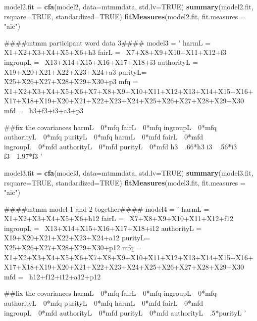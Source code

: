 \documentclass[english,man]{apa6}
\newenvironment{Shaded}{\begin{snugshade}}{\end{snugshade}}
\newcommand{\KeywordTok}[1]{\textcolor[rgb]{0.13,0.29,0.53}{\textbf{#1}}}
\newcommand{\DataTypeTok}[1]{\textcolor[rgb]{0.13,0.29,0.53}{#1}}
\newcommand{\StringTok}[1]{\textcolor[rgb]{0.31,0.60,0.02}{#1}}
\newcommand{\OtherTok}[1]{\textcolor[rgb]{0.56,0.35,0.01}{#1}}
\newcommand{\NormalTok}[1]{#1}
\theoremstyle{definition}
\theoremstyle{definition}
\theoremstyle{definition}
\theoremstyle{remark}
\begin{document}
\begin{Shaded}
\begin{Highlighting}[]
\NormalTok{model2.fit =}\StringTok{ }\KeywordTok{cfa}\NormalTok{(model2, }\DataTypeTok{data=}\NormalTok{mtmmdata, }\DataTypeTok{std.lv=}\OtherTok{TRUE}\NormalTok{)}
\KeywordTok{summary}\NormalTok{(model2.fit, }\DataTypeTok{rsquare=}\OtherTok{TRUE}\NormalTok{, }\DataTypeTok{standardized=}\OtherTok{TRUE}\NormalTok{)}
\KeywordTok{fitMeasures}\NormalTok{(model2.fit, }\DataTypeTok{fit.measures =} \StringTok{"aic"}\NormalTok{)}

\NormalTok{####mtmm participant word data 3####}
\NormalTok{model3 =}\StringTok{ '}
\StringTok{harmL =~ X1+X2+X3+X4+X5+X6+h3}
\StringTok{fairL =~ X7+X8+X9+X10+X11+X12+f3}
\StringTok{ingroupL =~ X13+X14+X15+X16+X17+X18+i3}
\StringTok{authorityL =~ X19+X20+X21+X22+X23+X24+a3}
\StringTok{purityL=~ X25+X26+X27+X28+X29+X30+p3}
\StringTok{mfq =~ X1+X2+X3+X4+X5+X6+X7+X8+X9+X10+X11+X12+X13+X14+X15+X16+X17+X18+X19+X20+X21+X22+X23+X24+X25+X26+X27+X28+X29+X30}
\StringTok{mfd =~ h3+f3+i3+a3+p3}

\StringTok{##fix the covariances}
\StringTok{harmL~~0*mfq}
\StringTok{fairL~~0*mfq}
\StringTok{ingroupL~~0*mfq}
\StringTok{authorityL~~0*mfq}
\StringTok{purityL~~0*mfq}
\StringTok{harmL~~0*mfd}
\StringTok{fairL~~0*mfd}
\StringTok{ingroupL~~0*mfd}
\StringTok{authorityL~~0*mfd}
\StringTok{purityL~~0*mfd}
\StringTok{h3~~.66*h3}
\StringTok{i3~~.56*i3}
\StringTok{f3~~1.97*f3}
\StringTok{'}

\NormalTok{model3.fit =}\StringTok{ }\KeywordTok{cfa}\NormalTok{(model3, }\DataTypeTok{data=}\NormalTok{mtmmdata, }\DataTypeTok{std.lv=}\OtherTok{TRUE}\NormalTok{)}
\KeywordTok{summary}\NormalTok{(model3.fit, }\DataTypeTok{rsquare=}\OtherTok{TRUE}\NormalTok{, }\DataTypeTok{standardized=}\OtherTok{TRUE}\NormalTok{)}
\KeywordTok{fitMeasures}\NormalTok{(model3.fit, }\DataTypeTok{fit.measures =} \StringTok{"aic"}\NormalTok{)}

\NormalTok{####mtmm model 1 and 2 together####}
\NormalTok{model4 =}\StringTok{ '}
\StringTok{harmL =~ X1+X2+X3+X4+X5+X6+h12}
\StringTok{fairL =~ X7+X8+X9+X10+X11+X12+f12}
\StringTok{ingroupL =~ X13+X14+X15+X16+X17+X18+i12}
\StringTok{authorityL =~ X19+X20+X21+X22+X23+X24+a12}
\StringTok{purityL=~ X25+X26+X27+X28+X29+X30+p12}
\StringTok{mfq =~ X1+X2+X3+X4+X5+X6+X7+X8+X9+X10+X11+X12+X13+X14+X15+X16+X17+X18+X19+X20+X21+X22+X23+X24+X25+X26+X27+X28+X29+X30}
\StringTok{mfd =~ h12+f12+i12+a12+p12}

\StringTok{##fix the covariances}
\StringTok{harmL~~0*mfq}
\StringTok{fairL~~0*mfq}
\StringTok{ingroupL~~0*mfq}
\StringTok{authorityL~~0*mfq}
\StringTok{purityL~~0*mfq}
\StringTok{harmL~~0*mfd}
\StringTok{fairL~~0*mfd}
\StringTok{ingroupL~~0*mfd}
\StringTok{authorityL~~0*mfd}
\StringTok{purityL~~0*mfd}
\StringTok{authorityL~~.5*purityL}
\StringTok{'}


\end{Highlighting}
\end{Shaded}
\end{document}
